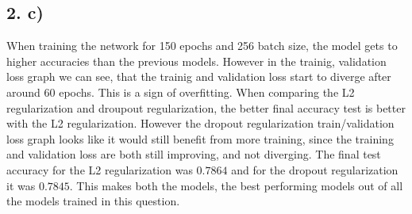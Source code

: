 \documentclass[11pt]{article}
\begin{document}
\subsection{2. c)}
When training the network for 150 epochs and 256 batch size, the model gets to higher accuracies than the previous models.
However in the trainig, validation loss graph we can see, that the trainig and validation loss start to diverge after around 60 epochs.
This is a sign of overfitting.
When comparing the L2 regularization and droupout regularization, the better final accuracy test is better with the L2 regularization.
However the dropout regularization train/validation loss graph looks like it would still benefit from more training, since the training and validation loss are both still improving, and not diverging.
The final test accuracy for the L2 regularization was $0.7864$ and for the dropout regularization it was $0.7845$.
This makes both the models, the best performing models out of all the models trained in this question.
\end{document}
